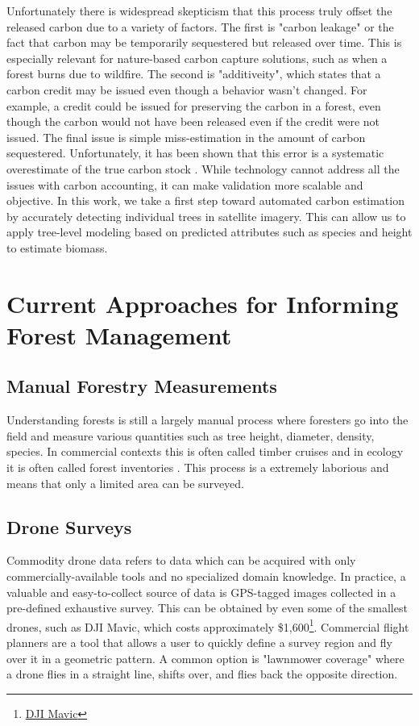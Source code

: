 Unfortunately there is widespread skepticism that this process truly offset the released carbon due to a variety of factors. The first is "carbon leakage" or the fact that carbon may be temporarily sequestered but released over time. This is especially relevant for nature-based carbon capture solutions, such as when a forest burns due to wildfire. The second is "additiveity", which states that a carbon credit may be issued even though a behavior wasn't changed. For example, a credit could be issued for preserving the carbon in a forest, even though the carbon would not have been released even if the credit were not issued. The final issue is simple miss-estimation in the amount of carbon sequestered. Unfortunately, it has been shown that this error is a systematic overestimate of the true carbon stock \cite{Badgley2022SystematicProgram,West2020OverstatedAmazon}. While technology cannot address all the issues with carbon accounting, it can make validation more scalable and objective. In this work, we take a first step toward automated carbon estimation by accurately detecting individual trees in satellite imagery. This can allow us to apply tree-level modeling based on predicted attributes such as species and height to estimate biomass.    


\section{Current Approaches for Informing Forest Management}
\subsection{Manual Forestry Measurements}
Understanding forests is still a largely manual process where foresters go into the field and measure various quantities such as tree height, diameter, density, species. In commercial contexts this is often called timber cruises \cite{ServiceFSHHANDBOOK} and in ecology it is often called forest inventories \cite{USForestServiceDepartmentofAgriculture2016FORESTPLOTS}. This process is a extremely laborious and means that only a limited area can be surveyed.

\subsection{Drone Surveys}
Commodity drone data refers to data which can be acquired with only commercially-available tools and no specialized domain knowledge. In practice, a valuable and easy-to-collect source of data is GPS-tagged images collected in a pre-defined exhaustive survey. This can be obtained by even some of the smallest drones, such as DJI Mavic, which costs approximately \$1,600\footnote{\href{https://store.dji.com/product/dji-mavic-3-classic}{DJI Mavic}}. Commercial flight planners are a tool that allows a user to quickly define a survey region and fly over it in a geometric pattern. A common option is "lawnmower coverage" where a drone flies in a straight line, shifts over, and flies back the opposite direction. 


